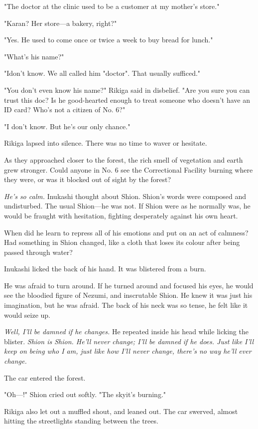 "The doctor at the clinic used to be a customer at my mother's store."

"Karan? Her store---a bakery, right?"

"Yes. He used to come once or twice a week to buy bread for lunch."

"What's his name?"

"I\el don't know. We all called him "doctor". That usually sufficed."

"You don't even know his name?" Rikiga said in disbelief. "Are you sure
you can trust this doc? Is he good-hearted enough to treat someone who
doesn't have an ID card? Who's not a citizen of No. 6?"

"I don't know. But he's our only chance."

Rikiga lapsed into silence. There was no time to waver or hesitate.

As they approached closer to the forest, the rich smell of vegetation
and earth grew stronger. Could anyone in No. 6 see the Correctional
Facility burning where they were, or was it blocked out of sight by the
forest?

\emph{He's so calm.} Inukashi thought about Shion. Shion's words were composed
and undisturbed. The usual Shion---he was not. If Shion were as he
normally was, he would be fraught with hesitation, fighting desperately
against his own heart.

When did he learn to repress all of his emotions and put on an act of
calmness? Had something in Shion changed, like a cloth that loses its
colour after being passed through water?

Inukashi licked the back of his hand. It was blistered from a burn.

He was afraid to turn around. If he turned around and focused his eyes,
he would see the bloodied figure of Nezumi, and inscrutable Shion. He
knew it was just his imagination, but he was afraid. The back of his
neck was so tense, he felt like it would seize up.

\emph{Well, I'll be damned if he changes.} He repeated inside his head while
licking the blister. \emph{Shion is Shion. He'll never change; I'll be damned
if he does. Just like I'll keep on being who I am, just like how I'll
never change, there's no way he'll ever change.}

The car entered the forest.

"Oh---!" Shion cried out softly. "The sky\el it's burning."

Rikiga also let out a muffled shout, and leaned out. The car swerved,
almost hitting the streetlights standing between the trees.

